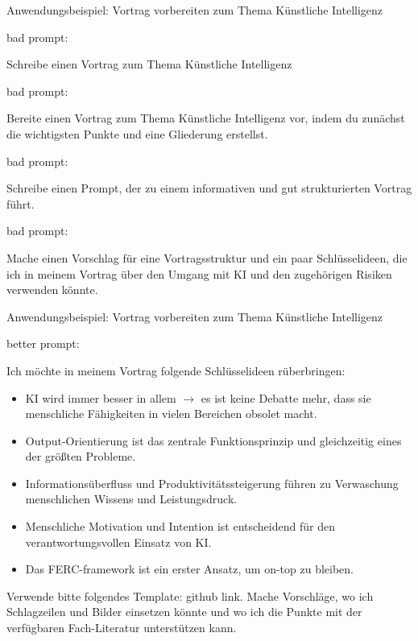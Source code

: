 \documentclass[aspectratio=\BeamerAspectRatio]{beamer}
\newcommand{\redrow}[2]{%
  \par\noindent
  \begin{minipage}[t]{2.7cm}\vspace{0pt}%
    \raggedright\color{granat}\bfseries\strut #1\par
  \end{minipage}\hspace{5mm}%
  \begin{minipage}[t]{\dimexpr\textwidth-3.2cm\relax}\vspace{0pt}%
    \raggedright\strut #2\par
  \end{minipage}\par\vspace{2.5mm}}
\begin{document}
\begin{frame}{Anwendungsbeispiel: Vortrag vorbereiten zum Thema Künstliche Intelligenz}
\small
\redrow{bad prompt:}{Schreibe einen Vortrag zum Thema Künstliche Intelligenz}
\redrow{bad prompt:}{Bereite einen Vortrag zum Thema Künstliche Intelligenz vor, indem du zunächst die wichtigsten Punkte und eine Gliederung erstellst.}
\redrow{bad prompt:}{Schreibe einen Prompt, der zu einem informativen und gut strukturierten Vortrag führt.}
\redrow{bad prompt:}{Mache einen Vorschlag für eine Vortragsstruktur und ein paar Schlüsselideen, die ich in meinem Vortrag über den Umgang mit KI und den zugehörigen Risiken verwenden könnte.}
\end{frame}

\begin{frame}{Anwendungsbeispiel: Vortrag vorbereiten zum Thema Künstliche Intelligenz}
\footnotesize
\redrow{better prompt:}{Ich möchte in meinem Vortrag folgende Schlüsselideen rüberbringen:
\begin{itemize}\setlength{\itemsep}{1pt}
\item KI wird immer besser in allem $\to$ es ist keine Debatte mehr, dass sie menschliche Fähigkeiten in vielen Bereichen obsolet macht.
\item Output-Orientierung ist das zentrale Funktionsprinzip und gleichzeitig eines der größten Probleme.
\item Informationsüberfluss und Produktivitätssteigerung führen zu Verwaschung menschlichen Wissens und Leistungsdruck.
\item Menschliche Motivation und Intention ist entscheidend für den verantwortungsvollen Einsatz von KI.
\item Das FERC-framework ist ein erster Ansatz, um \glqq on-top \grqq zu bleiben.
\end{itemize}
Verwende bitte folgendes Template: github link. Mache Vorschläge, wo ich Schlagzeilen und Bilder einsetzen könnte und wo ich die Punkte mit der verfügbaren Fach-Literatur unterstützen kann.}
\end{frame}
\end{document}
